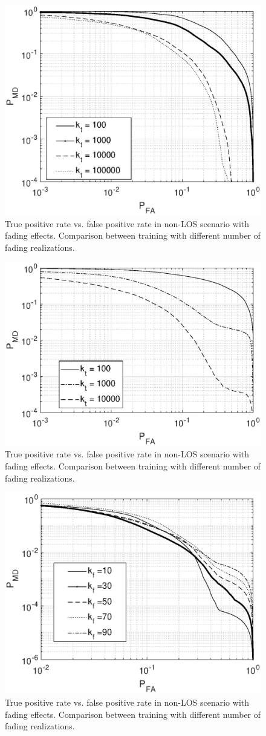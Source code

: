 \documentclass[draftcls,onecolumn,12pt]{IEEEtran}
\begin{document}
\begin{figure}
    \centering
    \includegraphics[width=0.5\columnwidth]{res_avg_nTrain.eps}
    \caption{True positive rate vs. false positive rate in non-LOS scenario with fading effects. Comparison between training with different number of fading realizations.}
    \label{fig:faded}
\end{figure}


\begin{figure}
    \centering
    \includegraphics[width=0.5\columnwidth]{res_avg_nTrain_SVM.eps}
    \caption{True positive rate vs. false positive rate in non-LOS scenario with fading effects. Comparison between training with different number of fading realizations.}
    \label{fig:faded}
\end{figure}

\begin{figure}
    \centering
    \includegraphics[width=0.5\columnwidth]{res_avg_nFading.eps}
    \caption{True positive rate vs. false positive rate in non-LOS scenario with fading effects. Comparison between training with different number of fading realizations.}
    \label{fig:faded}
\end{figure}
\end{document}
